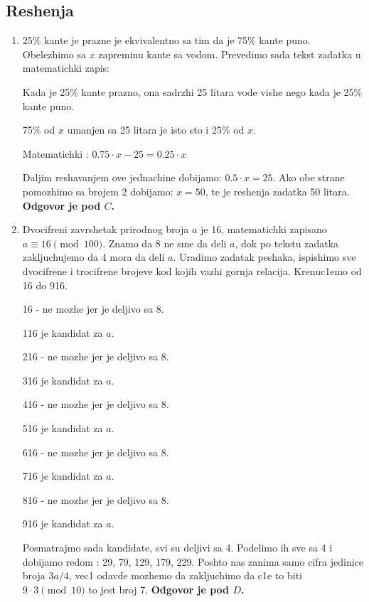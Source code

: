 \documentclass[a4paper,12pt]{article}
\begin{document}
\newpage

\subsection{Reshenja}
\begin{enumerate}[1.]

\item 25\% kante je prazne je ekvivalentno sa tim da je 75\% kante puno. Obelezhimo sa $x$ zapreminu kante sa vodom. Prevedimo sada tekst zadatka u matematichki zapis:
\par Kada je 25\% kante prazno, ona sadrzhi 25 litara vode vishe nego kada je 25\% kante puno.
\par 75\% od $x$ umanjen sa 25 litara je isto sto i 25\% od $x$.
\par Matematichki : $ 0.75 \cdot x - 25 = 0.25 \cdot x$
\par Daljim reshavanjem ove jednachine dobijamo: $ 0.5 \cdot x = 25$. Ako obe strane pomozhimo sa brojem 2 dobijamo: $x = 50$, te je reshenja zadatka 50 litara. \textbf{Odgovor je pod $C$.}

\item Dvocifreni zavrshetak prirodnog broja $a$ je 16, matematichki zapisano $ a \equiv 16 \pmod{100}$. Znamo da 8 ne sme da deli $a$, dok po tekstu zadatka zakljuchujemo da 4 mora da deli $a$. Uradimo zadatak peshaka, ispishimo sve dvocifrene i trocifrene brojeve kod kojih vazhi gornja relacija. Krenuc1emo od 16 do 916.
\par 16 - ne mozhe jer je deljivo sa 8.
\par 116 je kandidat za $a$.
\par 216 - ne mozhe jer je deljivo sa 8.
\par 316 je kandidat za $a$.
\par 416 - ne mozhe jer je deljivo sa 8.
\par 516 je kandidat za $a$.
\par 616 - ne mozhe jer je deljivo sa 8.
\par 716 je kandidat za $a$.
\par 816 - ne mozhe jer je deljivo sa 8.
\par 916 je kandidat za $a$.
\par Posmatrajmo sada kandidate, svi su deljivi sa 4. Podelimo ih sve sa 4 i dobijamo redom : 29, 79, 129, 179, 229. Poshto nas zanima samo cifra jedinice broja $3a/4$, vec1 odavde mozhemo da zakljuchimo da c1e to biti $9 \cdot 3 \pmod{10}$ to jest broj 7. \textbf{Odgovor je pod $D$.}


\end{enumerate}
\end{document}
